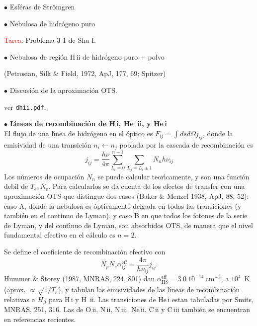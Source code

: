 
{$\bullet$ Esf\'eras de Str\"omgren}

{$\bullet$ Nebulosa de hidr\'ogeno puro}

\textcolor{red}{Tarea}: Problema 3-1 de Shu I. 

{$\bullet$ Nebulosa de regi\'on H\,{\sc ii} de hidr\'ogeno puro + polvo}

(Petrosian, Silk \& Field, 1972, ApJ, 177, 69; Spitzer)

{$\bullet$ Discusi\'on de la aproximaci\'on OTS}.

ver {\tt dhii.pdf}. 



{$\bullet$ \bf L\'{\i}neas de recombinaci\'on de H\,{\sc i}, He\,{\sc
ii}, y He\,{\sc i} } \\

El flujo de una l\'{\i}nea de hidr\'ogeno en el \'optico es $F_{ij} =
\int ds d\Omega j_{ij}$, donde la emisividad de una transici\'on $n_i
\leftarrow n_j$ poblada por la cascada de recombinaci\'on es
\[ 
j_{ij} = \frac{h  \nu}{4 \pi} \sum_{L_i=0}^{n-1} \sum_{L_j=L_i\pm1}
N_n h\nu_{ij}
\]
Los n\'umeros de ocupaci\'on $N_n$ se puede calcular
teor\'{\i}camente, y son una funci\'on debil de ${T_e,N_e}$. Para
calcularlos se da cuenta de los efectos de transfer con una
aproximaci\'on OTS que distingue dos casos (Baker \& Menzel 1938, ApJ,
88, 52): caso A, donde la nebulosa es \'opticamente delgada en todas
las transiciones (y tambi\'en en el continuo de Lyman), y caso B en
que todos los fotones de la serie de Lyman, y del cont\'{\i}nuo de
Lyman, son absorbidos OTS, de manera que el nivel fundamental efectivo
en el c\'alculo es $n=2$.


Se define el coeficiente de recombinaci\'on efectivo con
\[
N_p N_e \alpha_{ij}^\mathrm{eff} = \frac{4 \pi}{h \nu_{ij}}  j_{ij}.
\]
Hummer \& Storey (1987, MNRAS, 224, 801) dan
$\alpha_\mathrm{H\beta}^\mathrm{eff} =3.0~10^{-14}~$cm$^{-3}$, a
$10^4$~K (aprox.  $\propto
\sqrt{1/T_e}$), y tabulan las emisividades  de  las l\'{\i}neas de
recombinaci\'on relativas a $H_\beta$ para H\,{\sc i} y H\,{\sc
ii}. Las transiciones de He\,{\sc i} estan tabuladas por Smits, MNRAS,
251, 316. Las de O\,{\sc ii}, N\,{\sc ii}, N\,{\sc iii}, Ne\,{\sc ii},
C\,{\sc ii} y C\,{\sc iii} tambi\'en se encuentran en referencias
recientes. 

